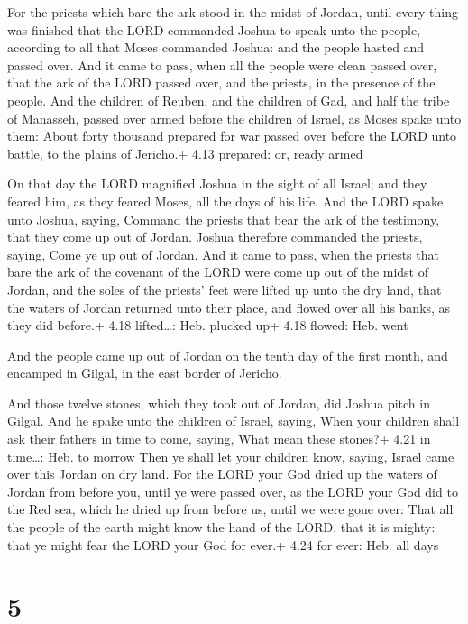  For the priests which bare the ark stood in the midst of
Jordan, until every thing was finished that the LORD commanded Joshua to
speak unto the people, according to all that Moses commanded Joshua: and
the people hasted and passed over.  And it came to pass,
when all the people were clean passed over, that the ark of the LORD
passed over, and the priests, in the presence of the people.
 And the children of Reuben, and the children of Gad, and
half the tribe of Manasseh, passed over armed before the children of
Israel, as Moses spake unto them:  About forty thousand
prepared for war passed over before the LORD unto battle, to the plains
of Jericho.+ 4.13 prepared: or, ready armed

 On that day the LORD magnified Joshua in the sight of
all Israel; and they feared him, as they feared Moses, all the days of
his life.  And the LORD spake unto Joshua, saying,
 Command the priests that bear the ark of the testimony,
that they come up out of Jordan.  Joshua therefore
commanded the priests, saying, Come ye up out of Jordan. 
And it came to pass, when the priests that bare the ark of the covenant
of the LORD were come up out of the midst of Jordan, and the soles of
the priests' feet were lifted up unto the dry land, that the waters of
Jordan returned unto their place, and flowed over all his banks, as they
did before.+ 4.18 lifted\ldots: Heb. plucked up+ 4.18 flowed: Heb. went

 And the people came up out of Jordan on the tenth day of
the first month, and encamped in Gilgal, in the east border of Jericho.

 And those twelve stones, which they took out of Jordan,
did Joshua pitch in Gilgal.  And he spake unto the children
of Israel, saying, When your children shall ask their fathers in time to
come, saying, What mean these stones?+ 4.21 in time\ldots: Heb. to
morrow  Then ye shall let your children know, saying,
Israel came over this Jordan on dry land.  For the LORD
your God dried up the waters of Jordan from before you, until ye were
passed over, as the LORD your God did to the Red sea, which he dried up
from before us, until we were gone over:  That all the
people of the earth might know the hand of the LORD, that it is mighty:
that ye might fear the LORD your God for ever.+ 4.24 for ever: Heb. all
days

\hypertarget{section-4}{%
\section{5}\label{section-4}}

